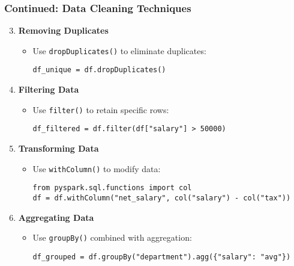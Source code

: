 \documentclass[aspectratio=169]{beamer}
\begin{document}
\begin{frame}[fragile]
    \frametitle{Continued: Data Cleaning Techniques}
    \begin{enumerate}
        \setcounter{enumi}{2}
        \item \textbf{Removing Duplicates}
        \begin{itemize}
            \item Use \texttt{dropDuplicates()} to eliminate duplicates:
            \begin{lstlisting}
df_unique = df.dropDuplicates()
            \end{lstlisting}
        \end{itemize}

        \item \textbf{Filtering Data}
        \begin{itemize}
            \item Use \texttt{filter()} to retain specific rows:
            \begin{lstlisting}
df_filtered = df.filter(df["salary"] > 50000)
            \end{lstlisting}
        \end{itemize}

        \item \textbf{Transforming Data}
        \begin{itemize}
            \item Use \texttt{withColumn()} to modify data:
            \begin{lstlisting}
from pyspark.sql.functions import col
df = df.withColumn("net_salary", col("salary") - col("tax"))
            \end{lstlisting}
        \end{itemize}

        \item \textbf{Aggregating Data}
        \begin{itemize}
            \item Use \texttt{groupBy()} combined with aggregation:
            \begin{lstlisting}
df_grouped = df.groupBy("department").agg({"salary": "avg"})
            \end{lstlisting}
        \end{itemize}
    \end{enumerate}
\end{frame}
\end{document}
